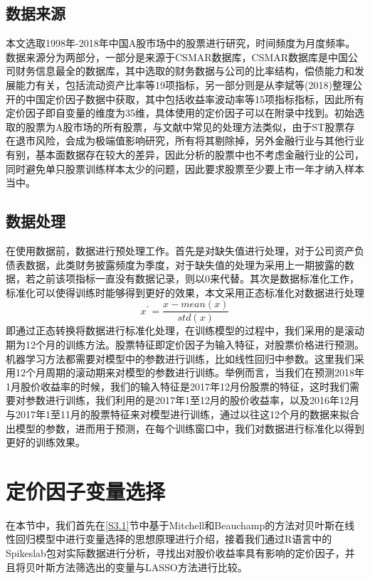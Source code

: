 \documentclass[12pt]{article} %
\begin{document}
	\subsection{数据来源}
	本文选取1998年-2018年中国A股市场中的股票进行研究，时间频度为月度频率。数据来源分为两部分，一部分是来源于CSMAR数据库，CSMAR数据库是中国公司财务信息最全的数据库，其中选取的财务数据与公司的比率结构，偿债能力和发展能力有关，包括流动资产比率等19项指标，另一部分则是从李斌等(2018)整理公开的中国定价因子数据中获取，其中包括收益率波动率等15项指标指标\cite{李斌2019机器学习驱动的基本面量化投资研究}，因此所有定价因子即自变量的维度为35维，具体使用的定价因子可以在附录中找到。初始选取的股票为A股市场的所有股票，与文献中常见的处理方法类似，由于ST股票存在退市风险，会成为极端值影响研究，所有将其剔除掉，另外金融行业与其他行业有别，基本面数据存在较大的差异，因此分析的股票中也不考虑金融行业的公司，同时避免单只股票训练样本太少的问题，因此要求股票至少要上市一年才纳入样本当中。
	
	
	\subsection{数据处理}
	在使用数据前，数据进行预处理工作。首先是对缺失值进行处理，对于公司资产负债表数据，此类财务披露频度为季度，对于缺失值的处理为采用上一期披露的数据，若之前该项指标一直没有数据记录，则以0来代替。其次是数据标准化工作，标准化可以使得训练时能够得到更好的效果，本文采用正态标准化对数据进行处理
	$$x^{\prime}=\dfrac{x-mean(x)}{std(x)}$$
	即通过正态转换将数据进行标准化处理，在训练模型的过程中，我们采用的是滚动期为12个月的训练方法。股票特征即定价因子为输入特征，对股票价格进行预测。机器学习方法都需要对模型中的参数进行训练，比如线性回归中参数。这里我们采用12个月周期的滚动期来对模型的参数进行训练。举例而言，当我们在预测2018年1月股价收益率的时候，我们的输入特征是2017年12月份股票的特征，这时我们需要对参数进行训练，我们利用的是2017年1至12月的股价收益率，以及2016年12月与2017年1至11月的股票特征来对模型进行训练，通过以往这12个月的数据来拟合出模型的参数，进而用于预测，在每个训练窗口中，我们对数据进行标准化以得到更好的训练效果。
	
	
	
	\newpage
	\section{定价因子变量选择 \label{S3}}
	
	在本节中，我们首先在\ref{S3.1}节中基于Mitchell和Beauchamp的方法\cite{mitchell1988bayesian}对贝叶斯在线性回归模型中进行变量选择的思想原理进行介绍，接着我们通过R语言中的Spikeslab包\cite{ishwaran2010spikeslab}对实际数据进行分析，寻找出对股价收益率具有影响的定价因子，并且将贝叶斯方法筛选出的变量与LASSO方法进行比较。
	
\end{document}
